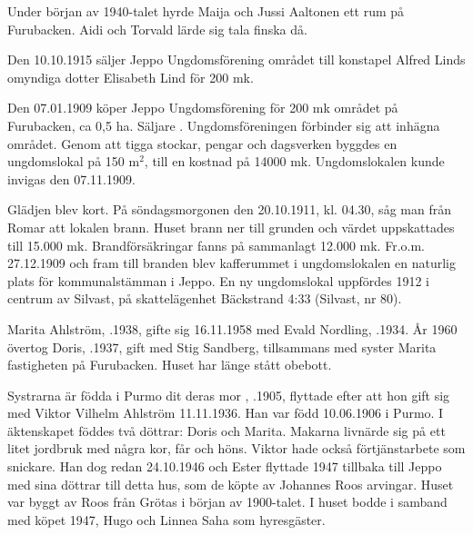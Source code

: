 Under början av 1940-talet hyrde Maija och Jussi Aaltonen ett rum på Furubacken. Aidi och Torvald lärde sig tala finska då.


%

Den 10.10.1915 säljer Jeppo Ungdomsförening området till konstapel Alfred Linds omyndiga dotter  Elisabeth Lind för 200 mk.


%
Den 07.01.1909 köper Jeppo Ungdomsförening för 200 mk området på Furubacken, ca 0,5 ha. Säljare . Ungdomsföreningen förbinder sig att inhägna området. Genom att tigga stockar, pengar och dagsverken byggdes en ungdomslokal på 150 m$^2$, till en kostnad på 14000 mk. Ungdomslokalen kunde invigas den 07.11.1909.

Glädjen blev kort. På söndagsmorgonen den 20.10.1911, kl. 04.30, såg man från Romar att lokalen brann. Huset brann ner till grunden och värdet uppskattades till 15.000 mk. Brandförsäkringar fanns på sammanlagt 12.000 mk. Fr.o.m. 27.12.1909 och fram till branden blev kafferummet i ungdomslokalen en naturlig plats för kommunalstämman i Jeppo. En ny ungdomslokal uppfördes 1912 i centrum av Silvast, på skattelägenhet Bäckstrand 4:33 (Silvast, nr 80).


%



%
Marita Ahlström, .1938, gifte sig 16.11.1958 med Evald Nordling, .1934. År 1960 övertog Doris, .1937, gift med Stig Sandberg, tillsammans med syster Marita fastigheten på Furubacken. Huset har länge stått obebott.

Systrarna är födda i Purmo dit deras mor , .1905, flyttade efter att hon gift sig med Viktor Vilhelm Ahlström 11.11.1936. Han var född 10.06.1906 i Purmo. I äktenskapet föddes två  döttrar: Doris och Marita. Makarna livnärde sig på ett litet jordbruk med några kor, får och höns. Viktor hade också förtjänstarbete som snickare. Han dog redan 24.10.1946 och Ester flyttade 1947 tillbaka till Jeppo med sina döttrar till detta hus, som de köpte av Johannes Roos arvingar. Huset var byggt av Roos från Grötas i början av 1900-talet. I huset bodde i samband med köpet 1947, Hugo och Linnea Saha som hyresgäster.

